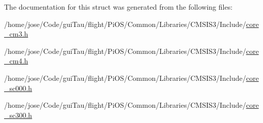 The documentation for this struct was generated from the following files\-:\begin{DoxyCompactItemize}
\item 
/home/jose/\-Code/gui\-Tau/flight/\-Pi\-O\-S/\-Common/\-Libraries/\-C\-M\-S\-I\-S3/\-Include/\hyperlink{_common_2_libraries_2_c_m_s_i_s3_2_include_2core__cm3_8h}{core\-\_\-cm3.\-h}\item 
/home/jose/\-Code/gui\-Tau/flight/\-Pi\-O\-S/\-Common/\-Libraries/\-C\-M\-S\-I\-S3/\-Include/\hyperlink{core__cm4_8h}{core\-\_\-cm4.\-h}\item 
/home/jose/\-Code/gui\-Tau/flight/\-Pi\-O\-S/\-Common/\-Libraries/\-C\-M\-S\-I\-S3/\-Include/\hyperlink{core__sc000_8h}{core\-\_\-sc000.\-h}\item 
/home/jose/\-Code/gui\-Tau/flight/\-Pi\-O\-S/\-Common/\-Libraries/\-C\-M\-S\-I\-S3/\-Include/\hyperlink{core__sc300_8h}{core\-\_\-sc300.\-h}\end{DoxyCompactItemize}

